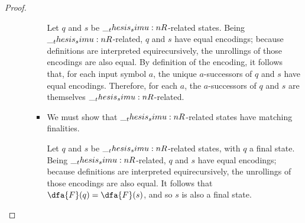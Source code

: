 \begin{proof}
\begin{enumerate}[parsep=0em, listparindent=\parindent]
\begin{itemize}[parsep=0em, listparindent=\parindent]
\begin{itemize}
        Let $q$ and $s$ be $\__thesis_simu:n {R}$-related states.
        Being $\__thesis_simu:n {R}$-related, $q$ and $s$ have equal encodings;
        because definitions are interpreted equirecursively, the unrollings of those encodings are also equal.
        By definition of the encoding, it follows that, for each input symbol $a$, the unique $a$-successors of $q$ and $s$ have equal encodings.
        Therefore, for each $a$, the $a$-successors of $q$ and $s$ are themselves $\__thesis_simu:n {R}$-related.

      \item
        We must show that $\__thesis_simu:n {R}$-related states have matching finalities.

        Let $q$ and $s$ be $\__thesis_simu:n {R}$-related states, with $q$ a final state.
        Being $\__thesis_simu:n {R}$-related, $q$ and $s$ have equal encodings;
        because definitions are interpreted equirecursively, the unrollings of those encodings are also equal.
        It follows that $\dfa{F}(q) = \dfa{F}(s)$, and so $s$ is also a final state.
      \end{itemize}
    \end{itemize}


\end{enumerate}
\end{proof}
